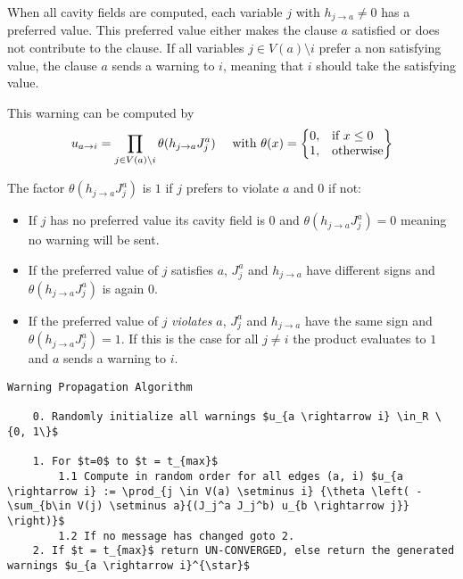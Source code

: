 When all cavity fields are computed, each variable $j$ with $h_{j \rightarrow a} \neq 0$ has a preferred value. This preferred value either makes the clause $a$ satisfied or does not contribute to the clause. If all variables $j \in V(a)\setminus i$ prefer a non satisfying value, the clause $a$ sends a warning to $i$, meaning that $i$ should take the satisfying value.

This warning can be computed by $$u_{a \rightarrow i} = \prod_{j\in V(a)\setminus i}{\theta(h_{j \rightarrow a}J_j^a)} \quad \text{ with } \theta(x) = \left\{
  \begin{array}{@{}ll@{}}
    0, & \text{if}\ x \leq 0 \\
    1, & \text{otherwise}
  \end{array}\right\}$$

The factor $\theta(h_{j \rightarrow a}J_j^a)$ is $1$ if $j$ prefers to violate $a$ and $0$ if not:
\begin{itemize}
\item[] If $j$ has no preferred value its cavity field is $0$ and $\theta(h_{j \rightarrow a}J_j^a) = 0$ meaning no warning will be sent.
\item[] If the preferred value of $j$ satisfies $a$, $J_j^a$ and $h_{j \rightarrow a}$ have different signs and  $\theta(h_{j \rightarrow a}J_j^a)$ is again $0$.
\item[] If the preferred value of $j$ \emph{violates} $a$, $J_j^a$ and $h_{j \rightarrow a}$ have the same sign and $\theta(h_{j \rightarrow a}J_j^a) = 1$. If this is the case for all $j \neq i$ the product evaluates to $1$ and $a$ sends a warning to $i$.
\end{itemize}
\begin{lstlisting}[mathescape=true]
	Warning Propagation Algorithm
	
	0. Randomly initialize all warnings $u_{a \rightarrow i} \in_R \{0, 1\}$
	
	1. For $t=0$ to $t = t_{max}$
		1.1 Compute in random order for all edges (a, i) $u_{a \rightarrow i} := \prod_{j \in V(a) \setminus i} {\theta \left( -\sum_{b\in V(j) \setminus a}{(J_j^a J_j^b) u_{b \rightarrow j}}  \right)}$
		1.2 If no message has changed goto 2.
	2. If $t = t_{max}$ return UN-CONVERGED, else return the generated warnings $u_{a \rightarrow i}^{\star}$
\end{lstlisting}

